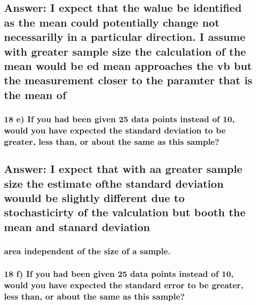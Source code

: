 \documentclass[]{article}
\begin{document}
\subsection{Answer: I expect that the walue be identified as the mean
could potentially change not necessarilly in a particular direction. I
assume with greater sample size the calculation of the mean would be ed
mean approaches the vb but the measurement closer to the paramter that
is the mean
of}\label{answer-i-expect-that-the-walue-be-identified-as-the-mean-could-potentially-change-not-necessarilly-in-a-particular-direction.-i-assume-with-greater-sample-size-the-calculation-of-the-mean-would-be-ed-mean-approaches-the-vb-but-the-measurement-closer-to-the-paramter-that-is-the-mean-of}

\subsubsection{18 e) If you had been given 25 data points instead of 10,
would you have expected the standard deviation to be greater, less than,
or about the same as this
sample?}\label{e-if-you-had-been-given-25-data-points-instead-of-10-would-you-have-expected-the-standard-deviation-to-be-greater-less-than-or-about-the-same-as-this-sample}

\subsection{Answer: I expect that with aa greater sample size the
estimate ofthe standard deviation wouuld be slightly different due to
stochasticirty of the valculation but booth the mean and stanard
deviation}\label{answer-i-expect-that-with-aa-greater-sample-size-the-estimate-ofthe-standard-deviation-wouuld-be-slightly-different-due-to-stochasticirty-of-the-valculation-but-booth-the-mean-and-stanard-deviation}

\subsubsection{area independent of the size of a
sample.}\label{area-independent-of-the-size-of-a-sample.}

\subsubsection{18 f) If you had been given 25 data points instead of 10,
would you have expected the standard error to be greater, less than, or
about the same as this
sample?}\label{f-if-you-had-been-given-25-data-points-instead-of-10-would-you-have-expected-the-standard-error-to-be-greater-less-than-or-about-the-same-as-this-sample}
\end{document}
